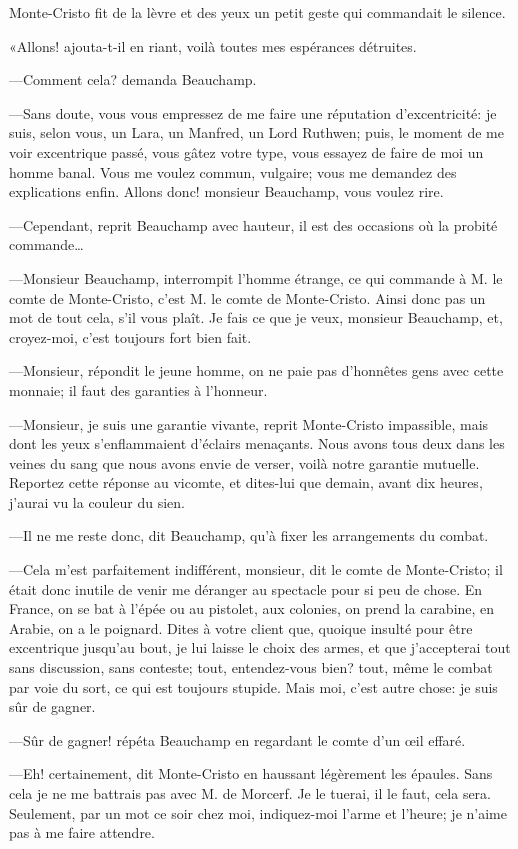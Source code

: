 Monte-Cristo fit de la lèvre et des yeux un petit geste qui commandait le silence. 

«Allons! ajouta-t-il en riant, voilà toutes mes espérances détruites. 

—Comment cela? demanda Beauchamp. 

—Sans doute, vous vous empressez de me faire une réputation d'excentricité: je suis, selon vous, un Lara, un Manfred, un Lord Ruthwen; puis, le moment de me voir excentrique passé, vous gâtez votre type, vous essayez de faire de moi un homme banal. Vous me voulez commun, vulgaire; vous me demandez des explications enfin. Allons donc! monsieur Beauchamp, vous voulez rire. 

—Cependant, reprit Beauchamp avec hauteur, il est des occasions où la probité commande\dots 

—Monsieur Beauchamp, interrompit l'homme étrange, ce qui commande à M. le comte de Monte-Cristo, c'est M. le comte de Monte-Cristo. Ainsi donc pas un mot de tout cela, s'il vous plaît. Je fais ce que je veux, monsieur Beauchamp, et, croyez-moi, c'est toujours fort bien fait. 

—Monsieur, répondit le jeune homme, on ne paie pas d'honnêtes gens avec cette monnaie; il faut des garanties à l'honneur. 

—Monsieur, je suis une garantie vivante, reprit Monte-Cristo impassible, mais dont les yeux s'enflammaient d'éclairs menaçants. Nous avons tous deux dans les veines du sang que nous avons envie de verser, voilà notre garantie mutuelle. Reportez cette réponse au vicomte, et dites-lui que demain, avant dix heures, j'aurai vu la couleur du sien. 

—Il ne me reste donc, dit Beauchamp, qu'à fixer les arrangements du combat. 

—Cela m'est parfaitement indifférent, monsieur, dit le comte de Monte-Cristo; il était donc inutile de venir me déranger au spectacle pour si peu de chose. En France, on se bat à l'épée ou au pistolet, aux colonies, on prend la carabine, en Arabie, on a le poignard. Dites à votre client que, quoique insulté pour être excentrique jusqu'au bout, je lui laisse le choix des armes, et que j'accepterai tout sans discussion, sans conteste; tout, entendez-vous bien? tout, même le combat par voie du sort, ce qui est toujours stupide. Mais moi, c'est autre chose: je suis sûr de gagner. 

—Sûr de gagner! répéta Beauchamp en regardant le comte d'un œil effaré. 

—Eh! certainement, dit Monte-Cristo en haussant légèrement les épaules. Sans cela je ne me battrais pas avec M. de Morcerf. Je le tuerai, il le faut, cela sera. Seulement, par un mot ce soir chez moi, indiquez-moi l'arme et l'heure; je n'aime pas à me faire attendre. 

